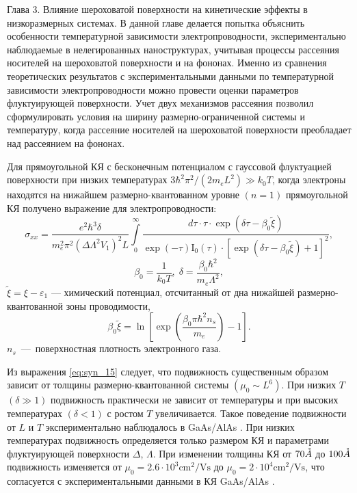 Глава 3. Влияние шероховатой поверхности на кинетические эффекты в низкоразмерных системах.
В данной главе делается попытка объяснить особенности температурной зависимости электропроводности, экспериментально наблюдаемые в нелегированных наноструктурах, учитывая процессы рассеяния носителей на шероховатой поверхности и на фононах. Именно из сравнения теоретических результатов с экспериментальными данными по температурной зависимости электропроводности можно провести оценки параметров флуктуирующей поверхности. Учет двух механизмов рассеяния позволил сформулировать условия на ширину размерно-ограниченной системы и температуру, когда рассеяние носителей на шероховатой поверхности преобладает над рассеянием на фононах.

Для прямоугольной КЯ с бесконечным потенциалом с гауссовой флуктуацией поверхности при низких температурах  $3\hbar^2 \pi^2 /\left(2m_e L^2 \right) \gg k_0 T$, когда электроны находятся на нижайшем размерно-квантованном уровне $(n=1)$ прямоугольной КЯ получено выражение для электропроводности:
\begin{equation} \label{eq:syn_15}
\sigma _{xx} =\frac{e^2 \hbar^3 \delta}{m_e^2 \pi^2 \left(\Delta \Lambda^2 V_1 \right)^2 L} \int\limits_0^\infty { \frac{d\tau \cdot \tau \cdot \exp \left(\delta \tau -\beta_0 \tilde{\xi }\right)}{\exp(-\tau )\mathrm{I}_0 (\tau )\cdot \left[\exp \left(\delta \tau -\beta_0 \tilde{\xi }\right)+1\right]^2 }},
\end{equation}
\[
\beta_0 = \frac{1}{k_0 T}, \; \delta =\frac{\beta_0 \hbar^2 }{m_e \Lambda^2 },
\] 
$\tilde{\xi }=\xi -\varepsilon _{1} $ --- химический потенциал, отсчитанный от дна нижайшей размерно-квантованной зоны проводимости,
\begin{equation} \label{eq:syn_16}
\beta_0 \tilde{\xi }=\ln\left[\exp\left(\frac{\beta_0 \pi \hbar^2 n_s }{m_e} \right)-1\right].
\end{equation}
$n_s $~---~поверхностная плотность электронного газа.

Из выражения \eqref{eq:syn_15} следует, что подвижность существенным образом зависит от толщины размерно-квантованной системы $(\mu_0 \sim L^6 )$. При низких $T$ $(\delta \gg 1)$ подвижность практически не зависит от температуры и при высоких температурах $(\delta <1)$ с ростом $T$ увеличивается. Такое поведение подвижности от $L$ и $T$ экспериментально наблюдалось в GaAs/AlAs \cite{Sakaki1987}. При низких температурах подвижность определяется только размером КЯ и параметрами флуктуирующей поверхности $\Delta $, $\Lambda $. При изменении толщины КЯ от $70 \AA$ до $100 \AA$ подвижность изменяется от $\mu_0 =2.6\cdot 10^3 \text{cm}^2 / \text{Vs}$ до $\mu_0 =2\cdot 10^4 \text{cm}^2 /\text{Vs}$, что согласуется с экспериментальными данными в КЯ GaAs/AlAs \cite{Sakaki1987}.

